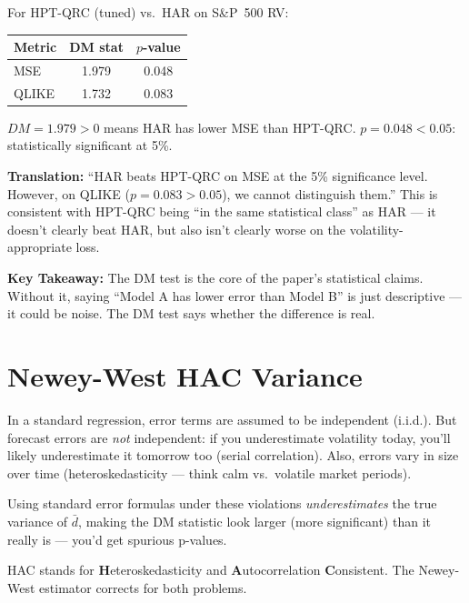 \documentclass[11pt]{article}
\newcommand{\concept}[2]{%
  \begin{tcolorbox}[conceptbox, title={#1}]
  #2
  \end{tcolorbox}
}
\newcommand{\example}[2]{%
  \begin{tcolorbox}[examplebox, title={Concrete Example: #1}]
  #2
  \end{tcolorbox}
}
\newcommand{\keypoint}[1]{%
  \begin{tcolorbox}[keybox]
  \textbf{Key Takeaway:} #1
  \end{tcolorbox}
}
\begin{document}
\example{Reading Table~5 in the Paper}{
For HPT-QRC (tuned) vs.\ HAR on S\&P~500 RV:
\begin{center}
\begin{tabular}{lcc}
\toprule
Metric & DM stat & $p$-value \\
\midrule
MSE & 1.979 & 0.048 \\
QLIKE & 1.732 & 0.083 \\
\bottomrule
\end{tabular}
\end{center}
$DM = 1.979 > 0$ means HAR has lower MSE than HPT-QRC.
$p = 0.048 < 0.05$: statistically significant at 5\%.

\textbf{Translation:} ``HAR beats HPT-QRC on MSE at the 5\% significance
level. However, on QLIKE ($p = 0.083 > 0.05$), we cannot distinguish
them.'' This is consistent with HPT-QRC being ``in the same statistical
class'' as HAR --- it doesn't clearly beat HAR, but also isn't clearly
worse on the volatility-appropriate loss.
}

\keypoint{The DM test is the core of the paper's statistical claims.
Without it, saying ``Model A has lower error than Model B'' is just
descriptive --- it could be noise. The DM test says whether the
difference is real.}

\section{Newey-West HAC Variance}\label{sec:hac}

\concept{Why Regular Standard Errors are Wrong for Forecast Errors}{
In a standard regression, error terms are assumed to be independent
(i.i.d.). But forecast errors are \emph{not} independent: if you
underestimate volatility today, you'll likely underestimate it tomorrow
too (serial correlation). Also, errors vary in size over time
(heteroskedasticity --- think calm vs.\ volatile market periods).

Using standard error formulas under these violations \emph{underestimates}
the true variance of $\bar d$, making the DM statistic look larger
(more significant) than it really is --- you'd get spurious p-values.

HAC stands for \textbf{H}eteroskedasticity and \textbf{A}utocorrelation
\textbf{C}onsistent. The Newey-West estimator corrects for both problems.
}
\end{document}
